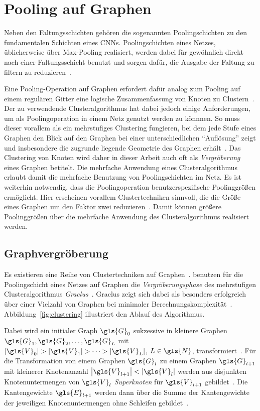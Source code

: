\section{Pooling auf Graphen}
\label{pooling}

Neben den Faltungsschichten gehören die sogenannten Poolingschichten zu den fundamentalen Schichten eines \glspl{CNN}.
Poolingschichten eines Netzes, üblicherweise über Max-Pooling realisiert, werden dabei für gewöhnlich direkt nach einer Faltungsschicht benutzt und sorgen dafür, die Ausgabe der Faltung zu filtern \bzw{} zu reduzieren~\cite{Nielsen}.

Eine Pooling-Operation auf Graphen erfordert dafür analog zum Pooling auf einem regulären Gitter eine logische Zusammenfassung von Knoten zu Clustern~\cite{Defferrard}.
Der zu verwendende Clusteralgorithmus hat dabei jedoch einige Anforderungen, um als Poolingoperation in einem Netz genutzt werden zu könnnen.
So muss dieser vorallem als ein mehrstufiges Clustering fungieren, bei dem jede Stufe eines Graphen den Blick auf den Graphen bei einer unterschiedlichen \enquote{Auflösung} zeigt und insbesondere die zugrunde liegende Geometrie des Graphen erhält~\cite{Defferrard}.
Das Clustering von Knoten wird daher in dieser Arbeit auch oft als \emph{Vergröberung} eines Graphen betitelt.
Die mehrfache Anwendung eines Clusteralgorithmus erlaubt damit die mehrfache Benutzung von Poolingschichten im Netz.
Es ist weiterhin notwendig, dass die Poolingoperation benutzerspezifische Poolinggrößen ermöglicht.
Hier erscheinen vorallem Clustertechniken sinnvoll, die die Größe eines Graphen um den Faktor zwei reduzieren~\cite{Defferrard}.
Damit können größere Poolinggrößen über die mehrfache Anwendung des Clusteralgorithmus realisiert werden.

\subsection{Graphvergröberung}
\label{graphvergroeberung}

Es existieren eine Reihe von Clustertechniken auf Graphen~\cite{Luxburg, graclus, Defferrard}.
\citeauthor{Defferrard} benutzen für die Poolingschicht eines Netzes auf Graphen die \emph{Vergröberungsphase} des mehrstufigen Clusteralgorithmus \emph{Graclus}~\cite{graclus}.
Graclus zeigt sich dabei als besonders erfolgreich über einer Vielzahl von Graphen bei minimaler Berechnungskomplexität~\cite{Defferrard}.
Abbildung~\ref{fig:clustering} illustriert den Ablauf des Algorithmus.

Dabei wird ein initialer Graph $\gls{G}_0$ sukzessive in kleinere Graphen $\gls{G}_1, \gls{G}_2, \ldots, \gls{G}_L$ mit $\left|\gls{V}_0\right| > \left|\gls{V}_1\right| > \cdots > |\gls{V}_L|$, $L \in \gls{N}$, transformiert~\cite{graclus}.
Für die Transformation von einem Graphen $\gls{G}_l$ zu einem Graphen $\gls{G}_{l+1}$ mit kleinerer Knotenanzahl $\left|\gls{V}_{l+1}\right| < \left|\gls{V}_l\right|$ werden aus disjunkten Knotenuntermengen von $\gls{V}_l$ \emph{Superknoten} für $\gls{V}_{l+1}$ gebildet~\cite{graclus}.
Die Kantengewichte $\gls{E}_{l+1}$ werden dann über die Summe der Kantengewichte der jeweiligen Knotenuntermengen ohne Schleifen gebildet~\cite{graclus}.

